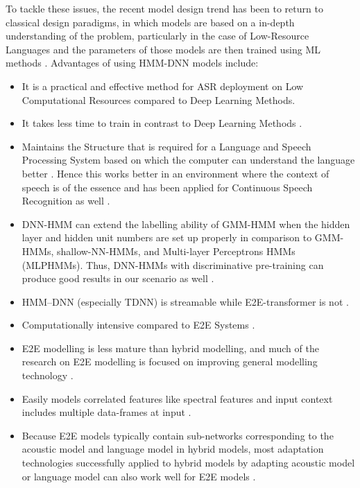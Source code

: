 To tackle these issues, the recent model design trend has been to return to classical design paradigms, in which models are based on a in-depth understanding of the problem, particularly in the case of Low-Resource Languages and the parameters of those models are then trained using ML methods \cite{backstrom_introduction_2022}. Advantages of using HMM-DNN models include:
\begin{itemize}
     \item It is a practical and effective method for ASR deployment on Low Computational Resources compared to Deep Learning Methods. 
     \item It takes less time to train in contrast to Deep Learning Methods \cite{naeem_subspace_2020}.
    \item Maintains the Structure that is required for a Language and Speech Processing System based on which the computer can understand the language better \cite{kincaid_state_2018}. Hence this works better in an environment where the context of speech is of the essence and has been applied for Continuous Speech Recognition as well \cite{backstrom_introduction_2022, morgan_continuous_1995}. 
    \item DNN-HMM can extend the labelling ability of GMM-HMM when the hidden layer and hidden unit numbers are set up properly in comparison to GMM-HMMs, shallow-NN-HMMs, and Multi-layer Perceptrons HMMs (MLPHMMs). Thus, DNN-HMMs with discriminative pre-training can produce good results in our scenario as well \cite{li_hybrid_2013}.
    \item HMM–DNN (especially TDNN) is streamable while E2E-transformer is not \cite{ritter_neural_2019}. 
    \item Computationally intensive compared to E2E Systems \cite{kincaid_brief_2018}.
    \item E2E modelling is less mature than hybrid modelling, and much of the research on E2E modelling is focused on improving general modelling technology \cite{backstrom_introduction_2022}. 
    \item Easily models correlated features like spectral features and input context includes multiple data-frames at input \cite{backstrom_introduction_2022}. 
    \item Because E2E models typically contain sub-networks corresponding to the acoustic model and language model in hybrid models, most adaptation technologies successfully applied to hybrid models by adapting acoustic model or language model can also work well for E2E models \cite{backstrom_introduction_2022}. %

\end{itemize}
